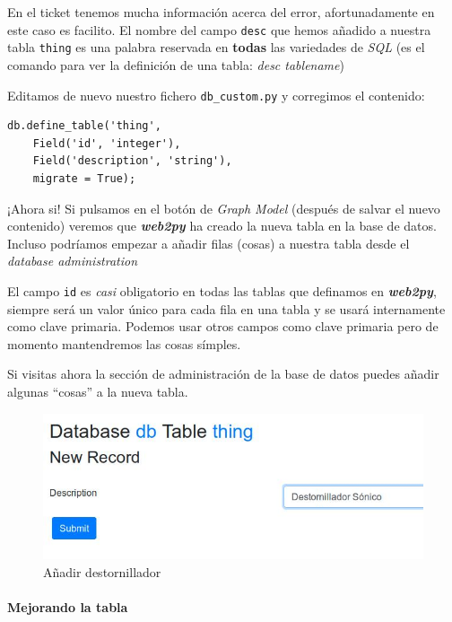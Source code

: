 \documentclass[
  12pt,
  spanish,
]{article}
\begin{document}
En el ticket tenemos mucha información acerca del error, afortunadamente
en este caso es facilito. El nombre del campo \texttt{desc} que hemos
añadido a nuestra tabla \texttt{thing} es una palabra reservada en
\textbf{todas} las variedades de \emph{SQL} (es el comando para ver la
definición de una tabla: \emph{desc tablename})

Editamos de nuevo nuestro fichero \texttt{db\_custom.py} y corregimos el
contenido:

\begin{verbatim}
db.define_table('thing',
    Field('id', 'integer'),
    Field('description', 'string'),
    migrate = True);
\end{verbatim}

¡Ahora si! Si pulsamos en el botón de \emph{Graph Model} (después de
salvar el nuevo contenido) veremos que \textbf{\emph{web2py}} ha creado
la nueva tabla en la base de datos. Incluso podríamos empezar a añadir
filas (cosas) a nuestra tabla desde el \emph{database administration}

El campo \texttt{id} es \emph{casi} obligatorio en todas las tablas que
definamos en \textbf{\emph{web2py}}, siempre será un valor único para
cada fila en una tabla y se usará internamente como clave primaria.
Podemos usar otros campos como clave primaria pero de momento
mantendremos las cosas símples.

Si visitas ahora la sección de administración de la base de datos puedes
añadir algunas ``cosas'' a la nueva tabla.

\begin{figure}
\centering
\includegraphics{src/img/add_thing_a.jpg}
\caption{Añadir destornillador}
\end{figure}

\hypertarget{mejorando-la-tabla}{%
\paragraph{Mejorando la tabla}\label{mejorando-la-tabla}}
\end{document}
